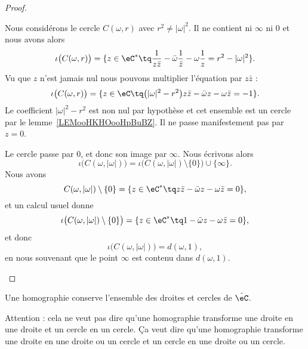 \begin{proof}
\begin{subproof}


		Nous considérons le cercle \( C(\omega,r)\) avec \( r^2\neq | \omega |^2\). Il ne contient ni \( \infty\) ni \( 0\) et nous avons alors
		\begin{equation}
			\iota\big( C(\omega,r) \big)=\{ z\in \eC^*\tq \frac{1}{ z\bar z }-\bar\omega\frac{1}{ \bar z }-\omega\frac{1}{ z }=r^2-| \omega |^2 \}.
		\end{equation}
		Vu que \( z\) n'est jamais nul nous pouvons multiplier l'équation par \( z\bar z\) :
		\begin{equation}
			\iota\big( C(\omega,r) \big)=\{ z\in \eC\tq \big( | \omega |^2-r^2 \big)z\bar z-\bar\omega z-\omega\bar z=-1 \}.
		\end{equation}
		Le coefficient \( | \omega |^2-r^2\) est non nul par hypothèse et cet ensemble est un cercle par le lemme~\ref{LEMooHKHOooHpBuBZ}. Il ne passe manifestement pas par \( z=0\).



		Le cercle passe par \( 0\), et donc son image par \( \infty\). Nous écrivons alors
		\begin{equation}
			\iota\big( C(\omega,| \omega |) \big)=\iota\big( C(\omega,| \omega |)\setminus\{ 0 \} \big)\cup\{ \infty \}.
		\end{equation}
		Nous avons
		\begin{equation}
			C(\omega,| \omega |)\setminus \{ 0 \} =\{ z\in \eC^*\tq z\bar z-\bar \omega z-\omega\bar z=0 \},
		\end{equation}
		et un calcul usuel donne
		\begin{equation}
			\iota\big( C(\omega,| \omega |)\setminus \{ 0 \}  \big)=\{ z\in \eC^*\tq 1-\bar \omega z-\omega\bar z=0 \},
		\end{equation}
		et donc
		\begin{equation}
			\iota\big( C(\omega,| \omega |) \big)=d(\omega,1),
		\end{equation}
		en nous souvenant que le point \( \infty\) est contenu dans \( d(\omega,1)\).

	\end{subproof}
\end{proof}

\begin{proposition}     \label{PROPooYFJBooAWxFIs}
	Une homographie conserve l'ensemble des droites et cercles de \( \hat\eC\).
\end{proposition}
Attention : cela ne veut pas dire qu'une homographie transforme une droite en une droite et un cercle en un cercle. Ça veut dire qu'une homographie transforme une droite en une droite ou un cercle et un cercle en une droite ou un cercle.

